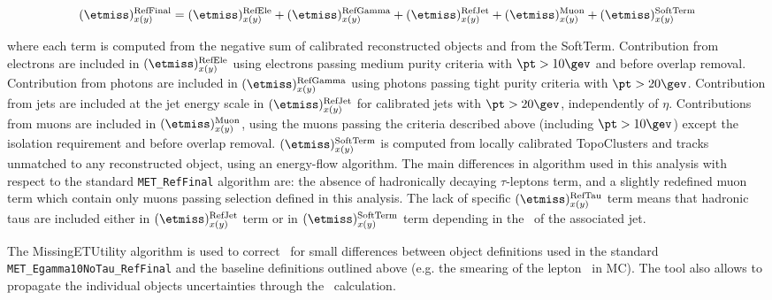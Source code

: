 \begin{equation}
  (\etmiss)^\text{RefFinal}_{x(y)} = (\etmiss)^\text{RefEle}_{x(y)} + (\etmiss)^\text{RefGamma}_{x(y)}+(\etmiss)^\text{RefJet}_{x(y)}+(\etmiss)^\text{Muon}_{x(y)}+(\etmiss)^\text{SoftTerm}_{x(y)}
\end{equation}


where each term is computed from the negative sum of calibrated reconstructed objects and from the SoftTerm.
Contribution from electrons are included in $(\etmiss)^\text{RefEle}_{x(y)}$ using electrons passing medium purity criteria
with $\pt>10\gev$ and before overlap removal. Contribution from photons are included in $(\etmiss)^\text{RefGamma}_{x(y)}$
using photons passing tight purity criteria with $\pt>20\gev$. Contribution from jets are included at the jet energy scale
in $(\etmiss)^\text{RefJet}_{x(y)}$ for calibrated jets with $\pt>20\gev$, independently of $\eta$. Contributions from muons
are included in $(\etmiss)^\text{Muon}_{x(y)}$, using the muons passing the criteria described above (including $\pt>10\gev$)
except the isolation requirement and before overlap removal. $(\etmiss)^\text{SoftTerm}_{x(y)}$ is computed from locally
calibrated TopoClusters and tracks unmatched to any reconstructed object, using an energy-flow algorithm. The main differences in \etmiss algorithm
used in this analysis with respect to the standard \texttt{MET\_RefFinal} algorithm are: the absence of hadronically decaying
$\tau$-leptons term, and a slightly redefined muon term which contain only muons passing selection defined in this analysis.
The lack of specific $(\etmiss)^\text{RefTau}_{x(y)}$ term means that hadronic taus are included either in $(\etmiss)^\text{RefJet}_{x(y)}$ term
or in $(\etmiss)^\text{SoftTerm}_{x(y)}$ term depending in the \pt\ of the associated jet.

The MissingETUtility algorithm is used to correct \etmiss\ for small differences between object definitions used in the standard \texttt{MET\_Egamma10NoTau\_RefFinal} and the baseline %
definitions outlined above (e.g. the smearing of the lepton \pt\ in MC). The tool also allows to propagate the individual objects uncertainties through the \etmiss\ calculation.


